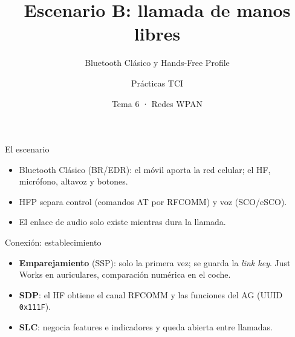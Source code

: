 \documentclass[aspectratio=169,10pt]{beamer}
\title{Escenario B: llamada de manos libres}
\subtitle{Bluetooth Clásico y Hands-Free Profile}
\author{Prácticas TCI}
\date{Tema 6 · Redes WPAN}
\begin{document}
\begin{frame}
  \titlepage
\end{frame}

\begin{frame}{El escenario}
  \begin{center}
  \end{center}
  \vspace{2mm}
  \begin{itemize}
    \item Bluetooth Clásico (BR/EDR): el móvil aporta la red celular; el HF, micrófono, altavoz y botones.
    \item HFP separa \alert{control} (comandos AT por RFCOMM) y \alert{voz} (SCO/eSCO).
    \item El enlace de audio solo existe mientras dura la llamada.
  \end{itemize}
\end{frame}

\begin{frame}{Conexión: establecimiento}
  \begin{center}
  \end{center}
  \vspace{2mm}
  \begin{itemize}
    \item \textbf{Emparejamiento} (SSP): solo la primera vez; se guarda la \emph{link key}. Just Works en auriculares, comparación numérica en el coche.
    \item \textbf{SDP}: el HF obtiene el canal RFCOMM y las funciones del AG (UUID \texttt{0x111F}).
    \item \textbf{SLC}: negocia features e indicadores y queda abierta entre llamadas.
  \end{itemize}
\end{frame}
\end{document}
